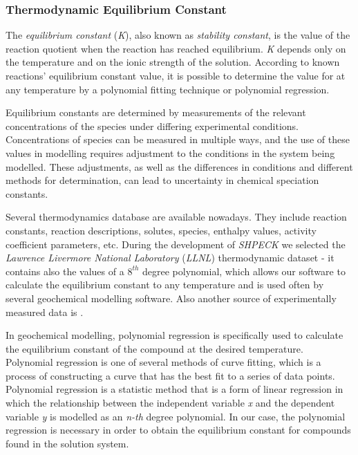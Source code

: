 \subsubsection{Thermodynamic Equilibrium Constant}
The \emph{equilibrium constant} (\emph{K}), also known as \emph{stability constant}, is the value of the reaction quotient when the reaction has reached equilibrium. \emph{K} depends only on the temperature and on the ionic strength of the solution. According to known reactions' equilibrium constant value, it is possible to determine the value for at any temperature by a polynomial fitting technique or polynomial regression.

Equilibrium constants are determined by measurements of the relevant concentrations of the species under differing experimental conditions. Concentrations of species can be measured in multiple ways, and the use of these values in modelling requires adjustment to the conditions in the system being modelled. These adjustments, as well as the differences in conditions and different methods for determination, can lead to uncertainty in chemical speciation constants.

Several thermodynamics database are available nowadays. They include reaction constants, reaction descriptions, solutes, species, enthalpy values, activity coefficient parameters, etc. During the development of \emph{SHPECK} we selected the \emph{Lawrence Livermore National Laboratory} (\emph{LLNL}) thermodynamic dataset - it contains also the values of a $8^{th}$ degree polynomial, which allows our software to calculate the equilibrium constant to any temperature and is used often by several geochemical modelling software. Also another source of experimentally measured data is \cite{Palandri:04}.

In geochemical modelling, polynomial regression is specifically used to calculate the equilibrium constant of the compound at the desired temperature. 
Polynomial regression is one of several methods of curve fitting, which is a process of constructing a curve that has the best fit to a series of data points. Polynomial regression is a statistic method that is a form of linear regression in which the relationship between the independent variable \emph{x} and the dependent variable \emph{y} is modelled as an \emph{n-th} degree polynomial. In our case, the polynomial regression is necessary in order to obtain the equilibrium constant for compounds found in the solution system.


